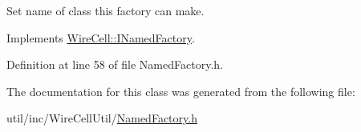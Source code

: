 Set name of class this factory can make. 



Implements \hyperlink{class_wire_cell_1_1_i_named_factory_a9175190c6f03f9d7fb43f3c8643e10d6}{Wire\+Cell\+::\+I\+Named\+Factory}.



Definition at line 58 of file Named\+Factory.\+h.



The documentation for this class was generated from the following file\+:\begin{DoxyCompactItemize}
\item 
util/inc/\+Wire\+Cell\+Util/\hyperlink{_named_factory_8h}{Named\+Factory.\+h}\end{DoxyCompactItemize}
